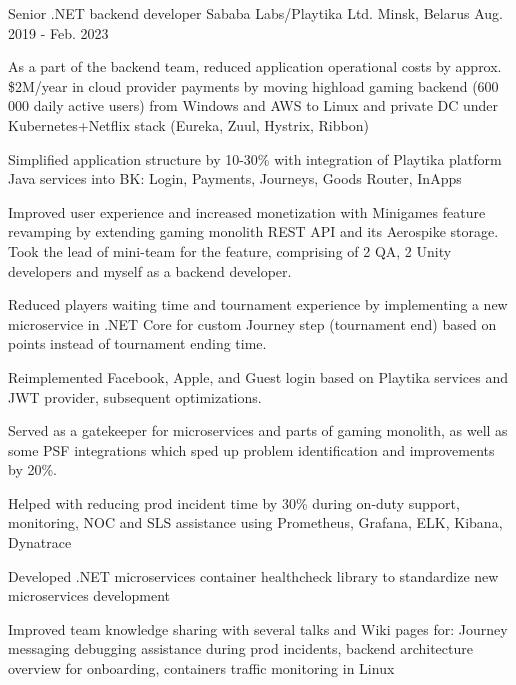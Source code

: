 

\begin{cventries}

  \cventry
    {Senior .NET backend developer} %
    {Sababa Labs/Playtika Ltd.} %
    {Minsk, Belarus} %
    {Aug. 2019 - Feb. 2023} %
    {
      \begin{cvitems} %
        \item {As a part of the backend team, reduced application operational costs by approx. \$2M/year in cloud provider payments by moving highload gaming backend (600 000 daily active users) from Windows and AWS to Linux and private DC under Kubernetes+Netflix stack (Eureka, Zuul, Hystrix, Ribbon)}
        \item {Simplified application structure by 10-30\% with integration of Playtika platform Java services into BK: Login, Payments, Journeys, Goods Router, InApps}
        \item {Improved user experience and increased monetization with Minigames feature revamping by extending gaming monolith REST API and its Aerospike storage. Took the lead of mini-team for the feature, comprising of 2 QA, 2 Unity developers and myself as a backend developer.}
        \item {Reduced players waiting time and tournament experience by implementing a new microservice in .NET Core for custom Journey step (tournament end) based on points instead of tournament ending time.}
        \item {Reimplemented Facebook, Apple, and Guest login based on Playtika services and JWT provider, subsequent optimizations.}
        \item {Served as a gatekeeper for microservices and parts of gaming monolith, as well as some PSF integrations which sped up problem identification and improvements by 20\%.}
        \item {Helped with reducing prod incident time by 30\% during on-duty support, monitoring, NOC and SLS assistance using Prometheus, Grafana, ELK, Kibana, Dynatrace}
        \item {Developed .NET microservices container healthcheck library to standardize new microservices development}
        \item {Improved team knowledge sharing with several talks and Wiki pages for: Journey messaging debugging assistance during prod incidents, backend architecture overview for onboarding, containers traffic monitoring in Linux}
      \end{cvitems}
    }


\end{cventries}

